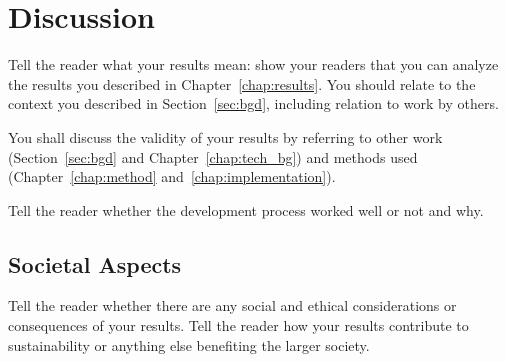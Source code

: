 \chapter{Discussion}
\label{chap:discussion}
\begin{instructions}
Tell the reader what your results mean: show your readers that you can analyze the results you described in Chapter~\ref{chap:results}. You should relate to the context you described in Section~\ref{sec:bgd}, including relation to work by others.

You shall discuss the validity of your results by referring to other work (Section~\ref{sec:bgd} and Chapter~\ref{chap:tech_bg}) and methods used (Chapter~\ref{chap:method} and~\ref{chap:implementation}).

Tell the reader whether the development process worked well or not and why.
\end{instructions}

\section{Societal Aspects}
\label{sec:societal}
\begin{instructions}
Tell the reader whether there are any social and ethical considerations or consequences of your results.  Tell the reader how your results contribute to sustainability or anything else benefiting the larger society.
\end{instructions}
